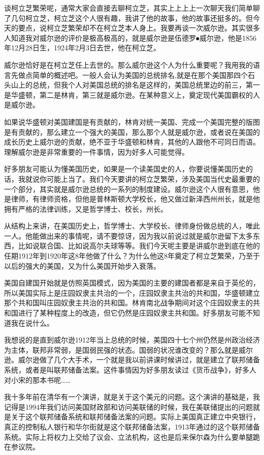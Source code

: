 \documentclass[UTF8, 12pt, a4paper]{ctexrep}
\begin{document}
谈柯立芝繁荣呢，通常大家会直接去聊柯立芝，其实上上上上一次聊天我们简单聊了几句柯立芝，柯立芝这个人很有趣，我讲了他的故事，他的故事还挺多的。但今天的要点，说柯立芝繁荣却不在柯立芝本人身上。我要再谈一次威尔逊。其实很多人知道我对威尔逊的评价是极高极高的，就是威尔逊是伍德罗⦁威尔逊，他是1856年12月28日生，1924年2月3日去世，他在柯立芝。

威尔逊恰好是在柯立芝任上去世的。那么威尔逊这个人为什么重要呢？我用我的语言先做点简单的概述吧。一般人会认为美国的总统排名,就是在那个美国那四个石头山上的总统，但我个人对美国总统的排名是这样的，美国总统里边的前三，第一是华盛顿，第二是林肯，第三就是威尔逊。在某种意义上，奠定现代美国霸权的人是威尔逊。

如果说华盛顿对美国建国是有贡献的，林肯对统一美国、完成一个美国完整的版图是有贡献的，那么建立一个强大的美国，那么那个人就是威尔逊，或者说在美国的成长历史上威尔逊的贡献，绝不亚于华盛顿和林肯，其他的人跟他不可同日而语。理解威尔逊是非常重要的一件事情，因为好多人可能觉得。

好多朋友可能认为懂美国历史，如果是一个读美国史的人，你要说懂美国历史的话，我就说你可能上当了。我们今天要讲的柯立芝繁荣，涉及美国当代史最重要的一个部分，其实就是威尔逊总统的一系列的制度建设。威尔逊这个人很有意思，他是律师，有律师资格，但他是普林斯顿大学校长，他又做过新泽西州州长，就是他拥有严格的法律训练，又是哲学博士、校长，州长。

从结构上来讲，在美国历史上，哲学博士、大学校长、律师身份做总统的人，唯此一人。他能做出来的事情呢，请不要惊讶，因为我以前说过就是威尔逊留下太多东西，比如说联合国、比如说高尔夫球等等。我们今天呢主要是讲威尔逊到底在他的任期1912年到1920年这8年他做了什么？为什么他这8年奠定了柯立芝繁荣，乃至于以后的强大的美国，又为什么美国开始步入衰落。

美国自建国开始就是仿照英国模式，因为美国的主要的建国者都是来自于英伦的，所以美国实际上是庄园奴隶主共治的一个，庄园奴隶主共治的共和国，华盛顿建立那个共和国叫庄园奴隶主共治的共和国。林肯南北战争期间对这个庄园奴隶主的共和国进行了某种程度上的改造，但它仍然是庄园奴隶主共和国。好多朋友可能不知道我在说什么。

我想说的是直到威尔逊1912年当上总统的时候，美国四十七个州仍然是州政治经济为主体，联邦非常弱，是国弱民强的状态。国弱的状况谁改变的？那么就是威尔逊。威尔逊做了几个大手术，一个就是我以前讲课时候讲过，就是建立了联邦储备系统，或者是叫联邦储备法案。这件事情因为好多朋友读过《货币战争》，好多人对小宋的那本书呢……

我十多年前在清华有一个演讲，就是关于这个美元的问题。这个演讲的基础是，我记得是1994年我们访问美国财政部和访问美联储的时候，我在美联储提出的问题就是关于这个联邦储备系统和联邦储备法案的问题。实际上美国真正建立中央银行，真正的控制私人银行和华尔街就是这个联邦储备法案，1913年通过的这个联邦储备系统。实际上将权力上交给了议会、立法机构，这也是后来保尔森为什么要单腿跪在参议院。
\end{document}
